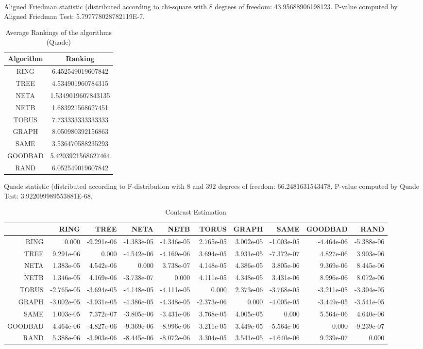 \documentclass[a4paper,10pt]{article}
\begin{document}
\begin{landscape}
Aligned Friedman statistic (distributed according to chi-square with 8 degrees of freedom: 43.95688906198123. 
P-value computed by Aligned Friedman Test: 5.797778028782119E-7.\newline


\newpage

\begin{table}[!htp]
\centering
\caption{Average Rankings of the algorithms (Quade)
}\begin{tabular}{c|c}
Algorithm&Ranking\\
\hline
 RING&6.452549019607842\\
 TREE&4.534901960784315\\
 NETA&1.5349019607843135\\
 NETB&1.683921568627451\\
 TORUS&7.733333333333333\\
 GRAPH&8.050980392156863\\
 SAME&3.536470588235293\\
 GOODBAD&5.4203921568627464\\
 RAND&6.052549019607842\\
\end{tabular}
\end{table}
Quade statistic (distributed according to F-distribution with 8 and 392 degrees of freedom: 66.2481631543478. 
P-value computed by Quade Test: 3.922099989553881E-68.\newline


\newpage

\begin{table}[!htp]
\centering\tiny
\caption{Contrast Estimation}
\begin{tabular}{
|r|r|r|r|r|r|r|r|r|r|}
\hline
 & RING& TREE& NETA& NETB& TORUS& GRAPH& SAME& GOODBAD& RAND\\
\hline
 RING&0.000&-9.291e-06&-1.383e-05&-1.346e-05&2.765e-05&3.002e-05&-1.003e-05&-4.464e-06&-5.388e-06\\
\hline
 TREE&9.291e-06&0.000&-4.542e-06&-4.169e-06&3.694e-05&3.931e-05&-7.372e-07&4.827e-06&3.903e-06\\
\hline
 NETA&1.383e-05&4.542e-06&0.000&3.738e-07&4.148e-05&4.386e-05&3.805e-06&9.369e-06&8.445e-06\\
\hline
 NETB&1.346e-05&4.169e-06&-3.738e-07&0.000&4.111e-05&4.348e-05&3.431e-06&8.996e-06&8.072e-06\\
\hline
 TORUS&-2.765e-05&-3.694e-05&-4.148e-05&-4.111e-05&0.000&2.373e-06&-3.768e-05&-3.211e-05&-3.304e-05\\
\hline
 GRAPH&-3.002e-05&-3.931e-05&-4.386e-05&-4.348e-05&-2.373e-06&0.000&-4.005e-05&-3.449e-05&-3.541e-05\\
\hline
 SAME&1.003e-05&7.372e-07&-3.805e-06&-3.431e-06&3.768e-05&4.005e-05&0.000&5.564e-06&4.640e-06\\
\hline
 GOODBAD&4.464e-06&-4.827e-06&-9.369e-06&-8.996e-06&3.211e-05&3.449e-05&-5.564e-06&0.000&-9.239e-07\\
\hline
 RAND&5.388e-06&-3.903e-06&-8.445e-06&-8.072e-06&3.304e-05&3.541e-05&-4.640e-06&9.239e-07&0.000\\
\hline


\end{tabular}
\end{table}
\end{landscape}
\end{document}
